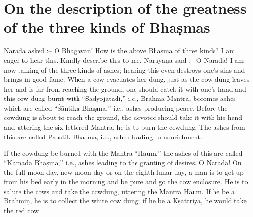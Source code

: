 \chapter{On the description of the greatness of the three kinds of Bha\d{s}mas}

N\=arada asked :-- O Bhagav\=an! How is the above Bha\d{s}ma of three kinds? I am eager to hear this. Kindly describe this to me. N\=ar\=aya\d{n}a said :-- O N\=arada! I am now talking of the three kinds of ashes; hearing this even destroys one's sins and brings in good fame. When a cow evacuates her dung, just as the cow dung leaves her and is far from reaching the ground, one should catch it with one's hand and this cow-dung burnt with ``Sadyoj\=at\=adi,'' i.e., Brahm\=a Mantra, becomes ashes which are called ``\'S\=antika Bha\d{s}ma,'' i.e., ashes producing peace. Before the cowdung is about to reach the ground, the devotee should take it with his hand and uttering the six lettered Mantra, he is to burn the cowdung. The ashes from this are called Paustik Bha\d{s}ma, i.e., ashes leading to nourishment.

If the cowdung be burned with the Mantra ``Haum,'' the ashes of this are called ``K\=amada Bha\d{s}ma,'' i.e., ashes leading to the granting of desires. O N\=arada! On the full moon day, new moon day or on the eighth lunar day, a man is to get up from his bed early in the morning and be pure and go the cow enclosure. He is to salute the cows and take the cowdung, uttering the Mantra Haum. If he be a Br\=ahmi\d{n}, he is to collect the white cow dung; if he be a K\d{s}attriya, he would take the red cow

